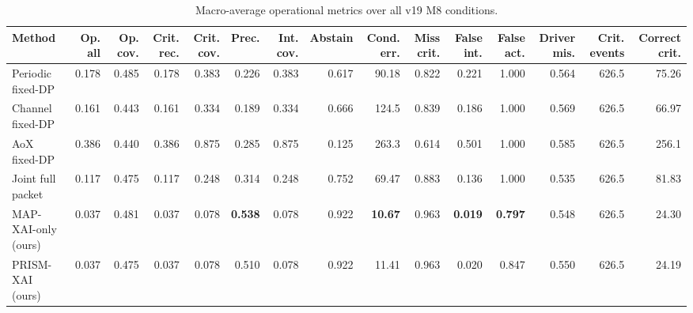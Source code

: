 



\begin{table}[t]
\centering
\caption{Macro-average operational metrics over all v19 M8 conditions.}
\label{tab:macroop}
\setlength{\tabcolsep}{3pt}
\renewcommand{\arraystretch}{1.08}

\begin{adjustbox}{max width=\textwidth}
\begin{tabular}{lrrrrrrrrrrrrrr}
\toprule
Method
& Op. all
& Op. cov.
& Crit. rec.
& Crit. cov.
& Prec.
& Int. cov.
& Abstain
& Cond. err.
& Miss crit.
& False int.
& False act.
& Driver mis.
& Crit. events
& Correct crit. \\
\midrule

Periodic fixed-DP
& 0.178 & 0.485 & 0.178 & 0.383 & 0.226
& 0.383 & 0.617 & 90.18 & 0.822 & 0.221
& 1.000 & 0.564 & 626.5 & 75.26 \\

Channel fixed-DP
& 0.161 & 0.443 & 0.161 & 0.334 & 0.189
& 0.334 & 0.666 & 124.5 & 0.839 & 0.186
& 1.000 & 0.569 & 626.5 & 66.97 \\

AoX fixed-DP
& 0.386 & 0.440 & 0.386 & 0.875 & 0.285
& 0.875 & 0.125 & 263.3 & 0.614 & 0.501
& 1.000 & 0.585 & 626.5 & 256.1 \\

Joint full packet
& 0.117 & 0.475 & 0.117 & 0.248 & 0.314
& 0.248 & 0.752 & 69.47 & 0.883 & 0.136
& 1.000 & 0.535 & 626.5 & 81.83 \\

\midrule
MAP-XAI-only (ours)
& 0.037 & 0.481 & 0.037 & 0.078 & \textbf{0.538}
& 0.078 & 0.922 & \textbf{10.67} & 0.963 & \textbf{0.019}
& \textbf{0.797} & 0.548 & 626.5 & 24.30 \\

PRISM-XAI (ours)
& 0.037 & 0.475 & 0.037 & 0.078 & 0.510
& 0.078 & 0.922 & 11.41 & 0.963 & 0.020
& 0.847 & 0.550 & 626.5 & 24.19 \\

\bottomrule
\end{tabular}
\end{adjustbox}
\end{table}